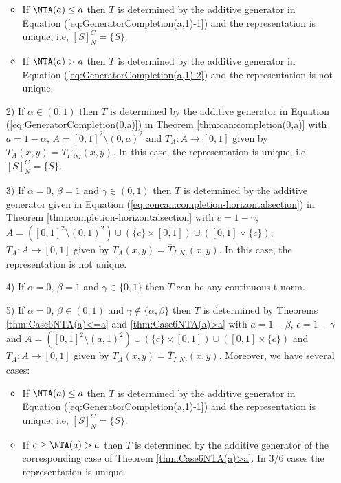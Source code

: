 \begin{proposition}
\begin{enumerate}
		\begin{itemize}
			\item If $\NTA(a) \leq a$ then $T$ is determined by the additive generator in Equation (\ref{eq:GeneratorCompletion(a,1)-1}) and the representation is unique, i.e, $[S]_N^C=\{S\}$.
			\item If $\NTA(a)>a$ then $T$ is determined by the additive generator in Equation (\ref{eq:GeneratorCompletion(a,1)-2}) and the representation is not unique.
		\end{itemize}
		\item[2)] If $\alpha \in (0,1)$ then $T$ is determined by the additive generator in Equation (\ref{eq:GeneratorCompletion(0,a)}) in Theorem \ref{thm:can:completion(0,a)} with $a=1-\alpha$, $A=[0,1]^2 \setminus (0,a)^2$ and $T_A : A \to [0,1]$ given by $T_A(x,y)=\overline{T}_{I,N_I}(x,y)$. In this case, the representation is unique, i.e, $[S]_N^C=\{S\}$.
		\item[3)] If $\alpha=0$, $\beta=1$ and $\gamma \in (0,1)$ then $T$ is determined by the additive generator given in Equation (\ref{eq:concan:completion-horizontalsection}) in Theorem \ref{thm:completion-horizontalsection} with $c=1-\gamma$, $A=([0,1]^2 \setminus (0,1)^2) \cup (\{c\} \times [0,1]) \cup ([0,1] \times \{c\})$, $T_A : A \to [0,1]$ given by $T_A(x,y)=\overline{T}_{I,N_I}(x,y)$. In this case, the representation is not unique.
		\item[4)] If $\alpha=0$, $\beta=1$ and $\gamma \in \{0,1\}$ then $T$ can be  any continuous t-norm.
		\item[5)] If $\alpha=0$, $\beta \in(0,1)$ and $\gamma \not \in \{\alpha, \beta\}$ then $T$ is determined by Theorems \ref{thm:Case6NTA(a)<=a} and \ref{thm:Case6NTA(a)>a} with $a=1-\beta$, $c=1-\gamma$ and $A=([0,1]^2 \setminus (a,1)^2) \cup (\{c\} \times [0,1]) \cup ([0,1] \times \{c\})$ and $T_A : A \to [0,1]$ given by $T_A(x,y)=\overline{T}_{I,N_I}(x,y)$. Moreover, we have several cases:
		\begin{itemize}
			\item If $\NTA(a) \leq a$ then $T$ is determined by the additive generator in Equation (\ref{eq:GeneratorCompletion(a,1)-1}) and the representation is unique, i.e, $[S]_N^C=\{S\}$.
			\item If $c\geq\NTA(a)>a$ then $T$ is determined by the additive generator of the corresponding case of Theorem \ref{thm:Case6NTA(a)>a}. In 3/6 cases the representation is unique.
		\end{itemize}
	\end{enumerate}
\end{proposition}

